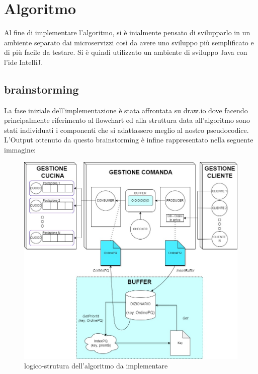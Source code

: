 \section{Algoritmo}
Al fine di implementare l'algoritmo, si è inialmente pensato di svilupparlo in un ambiente separato dai microservizzi così da avere uno sviluppo più semplificato e di più facile da testare.
Si è quindi utilizzato un ambiente di sviluppo Java con l'ide IntelliJ.

\subsection{brainstorming}
La fase iniziale dell'implementazione è stata affrontata su draw.io dove facendo principalmente riferimento al flowchart ed alla struttura data all'algoritmo sono stati individuati i componenti che si adattassero meglio al nostro pseudocodice. 
L'Output ottenuto da questo brainstorming è infine rappresentato nella seguente immagine:
\begin{figure}[htbp]
	\centering
	\includegraphics[scale=0.5]{iterazione3/images/Struttura_implementativa_algoritmo.jpg}
	\caption{logico-strutura dell'algoritmo da implementare\label{fig:Struttura_implementativa_algoritmo}}
\end{figure}

